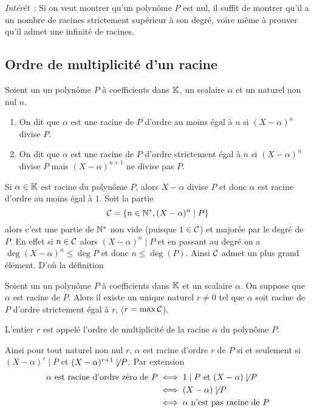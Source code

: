 \emph{Intérêt}~: Si on veut montrer qu'un polynôme \(P\) est nul, il suffit de 
montrer qu'il a un nombre de racines strictement supérieur à son degré, voire 
même à prouver qu'il admet une infinité de racines.

\subsection{Ordre de multiplicité d'un racine}

\begin{defdef}
  Soient un un polynôme \(P\) à coefficients dans \(\mathbb{K}\), un scalaire \(\alpha\) 
  et un naturel non nul \(n\).
  \begin{enumerate}
    \item On dit que \(\alpha\) est une racine de \(P\) d'ordre au moins égal à 
      \(n\) si \((X-\alpha)^n\) divise \(P\).
    \item On dit que \(\alpha\) est une racine de \(P\) d'ordre strictement égal 
      à \(n\) si \((X-\alpha)^n\) divise \(P\) mais \((X-\alpha)^{n+1}\) ne 
      divise pas \(P\).
  \end{enumerate}
\end{defdef}

Si \(\alpha \in \mathbb{K}\) est racine du polynôme \(P\), alors \(X-\alpha\) divise 
\(P\) et donc \(\alpha\) est racine d'ordre au moins égal à \(1\). Soit la 
partie
\begin{equation}
  \mathcal{C} = \{n \in \mathbb{N}^*, (X-\alpha)^n \mid{} P\}
\end{equation}
alors c'est une partie de \(\mathbb{N}^*\) non vide (puisque \(1 \in \mathcal{C}\)) et 
majorée par le degré de \(P\). En effet si \(n \in \mathcal{C}\) alors 
\((X-\alpha)^n \mid{} P\) et en passant au degré on a \(\deg(X-\alpha)^n 
\leqslant \deg P\) et donc \(n \leqslant \deg(P)\). Ainsi \(\mathcal{C}\) admet un 
plus grand élément. D'où la définition

\begin{defdef}
  Soient un un polynôme \(P\) à coefficients dans \(\mathbb{K}\) et un scalaire 
  \(\alpha\). On suppose que \(\alpha\) est racine de \(P\). Alors il existe un 
  unique naturel \(r \neq 0\) tel que \(\alpha\) soit racine de \(P\) d'ordre 
  strictement égal à \(r\), (\(r = \max \mathcal{C}\)).

L'entier \(r\) est appelé l'ordre de multiplicité de la racine \(\alpha\) du 
polynôme \(P\). \end{defdef}

Ainsi pour tout naturel non nul \(r\), \(\alpha\) est racine d'ordre \(r\) de 
\(P\) si et seulement si \((X-\alpha)^r \mid{} P\) et \((X-\alpha)^{r+1} 
\not\mid{} P\). Par extension
\begin{align}
  \alpha \text{~est racine d'ordre zéro de~} P &\iff 1\mid{}P \text{~et~} 
  (X-\alpha) \not\mid{} P \\
  &\iff (X-\alpha) \not\mid{} P\\
  &\iff \alpha \text{~n'est pas racine de~} P
\end{align}

